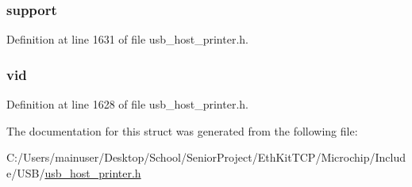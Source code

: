 \subsubsection[{support}]{ support}\label{struct_u_s_b___p_r_i_n_t_e_r___s_p_e_c_i_f_i_c___i_n_t_e_r_f_a_c_e_a608dd933f8c7b8e68ea8eb0d6db48cd0}


Definition at line 1631 of file usb\+\_\+host\+\_\+printer.\+h.

\hypertarget{struct_u_s_b___p_r_i_n_t_e_r___s_p_e_c_i_f_i_c___i_n_t_e_r_f_a_c_e_a9fcc011b7b6427b55322964f2d01781f}{}
\subsubsection[{vid}]{ vid}\label{struct_u_s_b___p_r_i_n_t_e_r___s_p_e_c_i_f_i_c___i_n_t_e_r_f_a_c_e_a9fcc011b7b6427b55322964f2d01781f}


Definition at line 1628 of file usb\+\_\+host\+\_\+printer.\+h.



The documentation for this struct was generated from the following file\+:\begin{DoxyCompactItemize}
\item 
C\+:/\+Users/mainuser/\+Desktop/\+School/\+Senior\+Project/\+Eth\+Kit\+T\+C\+P/\+Microchip/\+Include/\+U\+S\+B/\hyperlink{usb__host__printer_8h}{usb\+\_\+host\+\_\+printer.\+h}\end{DoxyCompactItemize}
